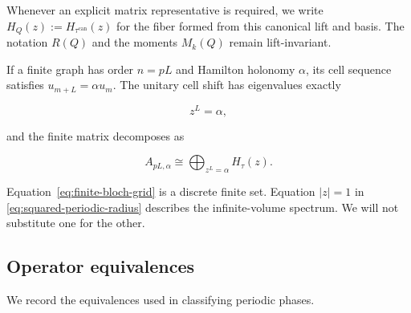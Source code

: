 Whenever an explicit matrix representative is required, we write
\(H_Q(z):=H_{\tau^{\mathrm{can}}}(z)\) for the fiber formed from this canonical lift and
basis. The notation \(R(Q)\) and the moments \(M_k(Q)\) remain lift-invariant.

If a finite graph has order \(n=pL\) and Hamilton holonomy \(\alpha\), its cell
sequence satisfies \(u_{m+L}=\alpha u_m\). The unitary cell shift has eigenvalues
exactly

\begin{equation}
\label{eq:finite-bloch-grid}
z^L=\alpha,
\end{equation}

and the finite matrix decomposes as

\begin{equation}
\label{eq:finite-floquet-decomposition}
A_{pL,\alpha}  \cong  \bigoplus_{z^L=\alpha} H_\tau(z).
\end{equation}

Equation~\eqref{eq:finite-bloch-grid} is a discrete finite set. Equation \(\lvert z\rvert=1\) in \eqref{eq:squared-periodic-radius} describes
the infinite-volume spectrum. We will not substitute one for the other.

\subsection{Operator equivalences}

We record the equivalences used in classifying periodic phases.


